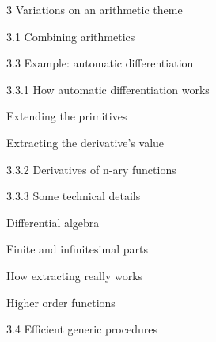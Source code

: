 \documentclass[12pt]{PalisadesLakesBook}
\begin{document}
\begin{plSection}{3 Variations on an arithmetic theme}
\begin{plSection}{3.1 Combining arithmetics}
\begin{plSection}{3.3 Example: automatic differentiation}
\begin{plSection}{3.3.1 How automatic differentiation works}
\begin{plSection}{Extending the primitives}
\end{plSection}%
\begin{plSection}{Extracting the derivative's value}
\end{plSection}%
\end{plSection}%
\begin{plSection}{3.3.2 Derivatives of n-ary functions}
\end{plSection}%
\begin{plSection}{3.3.3 Some technical details}



\begin{plSection}{Differential algebra}
\end{plSection}%
\begin{plSection}{Finite and infinitesimal parts}
\end{plSection}%
\begin{plSection}{How extracting really works}
\end{plSection}%
\begin{plSection}{Higher order functions}
\end{plSection}%
\end{plSection}%
\end{plSection}%
\begin{plSection}{3.4 Efficient generic procedures}


\end{plSection}
\end{plSection}
\end{plSection}
\end{document}
